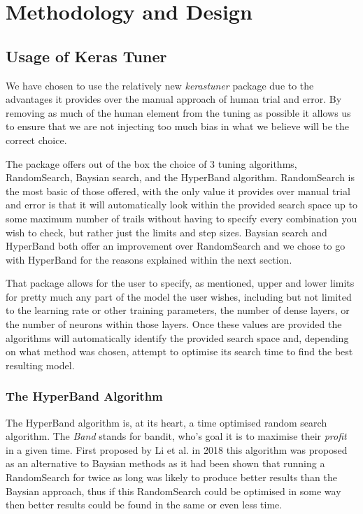 \documentclass[12pt]{article}
\numberwithin{equation}{section}
\numberwithin{figure}{section}
\numberwithin{table}{section}
\begin{document}
\section{Methodology and Design}
\subsection{Usage of Keras Tuner}
\label{sub:kerastuner}
We have chosen to use the relatively new \emph{kerastuner} package due to the advantages it provides over the manual approach of human trial and error. By removing as much of the human element from the tuning as possible it allows us to ensure that we are not injecting too much bias in what we believe will be the correct choice. 

The package offers out of the box the choice of 3 tuning algorithms, RandomSearch, Baysian search, and the HyperBand algorithm. RandomSearch is the most basic of those offered, with the only value it provides over manual trial and error is that it will automatically look within the provided search space up to some maximum number of trails without having to specify every combination you wish to check, but rather just the limits and step sizes. Baysian search and HyperBand both offer an improvement over RandomSearch and we chose to go with HyperBand for the reasons explained within the next section.

That package allows for the user to specify, as mentioned, upper and lower limits for pretty much any part of the model the user wishes, including but not limited to the learning rate or other training parameters, the number of dense layers, or the number of neurons within those layers. Once these values are provided the algorithms will automatically identify the provided search space and, depending on what method was chosen, attempt to optimise its search time to find the best resulting model.
\subsubsection{The HyperBand Algorithm}
The HyperBand algorithm is, at its heart, a time optimised random search algorithm. The \emph{Band} stands for bandit, who's goal it is to maximise their \emph{profit} in a given time. First proposed by Li et al. in 2018 \cite{Li2018} this algorithm was proposed as an alternative to Baysian methods as it had been shown that running a RandomSearch for twice as long was likely to produce better results than the Baysian approach, thus if this RandomSearch could be optimised in some way then better results could be found in the same or even less time.
\end{document}
